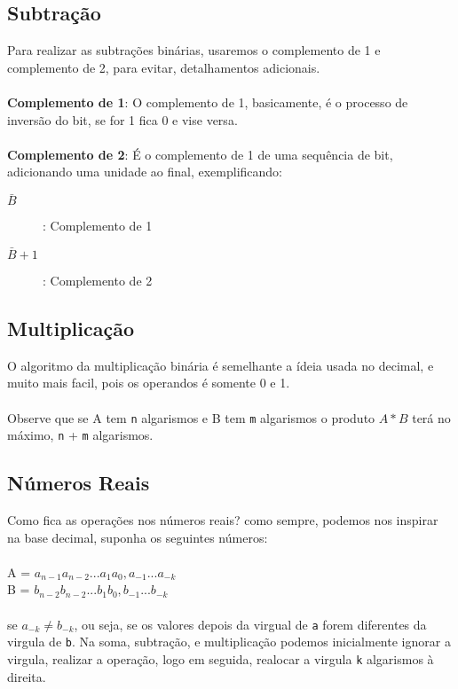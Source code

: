 \documentclass[12pt, onecolumn]{article}
\begin{document}
	\subsection{Subtração}
	Para realizar as subtrações binárias, usaremos o complemento de 1 e complemento
	de 2, para evitar, detalhamentos adicionais.\\
	\\
	\textbf{Complemento de 1}: O complemento de 1, basicamente, é o processo
	de inversão do bit, se for 1 fica 0 e vise versa.\\
	\\
	\textbf{Complemento de 2}: É o complemento de 1 de uma sequência de bit,
	adicionando uma unidade ao final, exemplificando:
	
	\begin{description}
		\item[$\bar{B}$]: Complemento de 1
		\item[$\bar{B} + 1$]: Complemento de 2
	\end{description}

	\subsection{Multiplicação}
	O algoritmo da multiplicação binária é semelhante a ídeia usada no decimal, 
	e muito mais facil, pois os operandos é somente 0 e 1.\\
	\\
	Observe que se A tem \texttt{n} algarismos e B tem \texttt{m} algarismos
	o produto $A * B$ terá no máximo, \texttt{n} + \texttt{m} algarismos.
	
	\subsection{Números Reais}
	Como fica as operações nos números reais? como sempre, podemos nos inspirar na
	base decimal, suponha os seguintes números: \\
	\\
	A = $a_{n-1} a_{n-2} ... a_1 a_0, a_{-1} ... a_{-k}$\\
	B = $b_{n-2} b_{n-2} ... b_1 b_0, b_{-1} ... b_{-k}$\\
	\\
	se $a_{-k} \ne b_{-k}$, ou seja, se os valores depois da virgual de \texttt{a} 
	forem diferentes da virgula de \texttt{b}. Na soma, subtração, e multiplicação
	podemos	inicialmente ignorar a virgula, realizar a operação, logo em seguida, 
	realocar a virgula \texttt{k} algarismos à direita.
\end{document}
